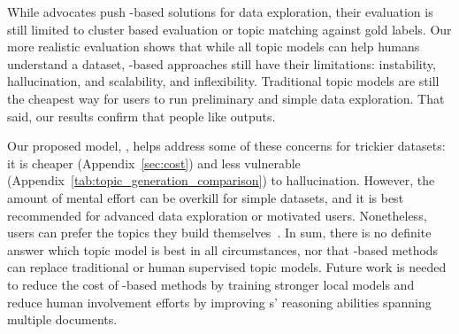 
While advocates push \mm{}-based solutions for data exploration, their
evaluation is still limited to cluster based evaluation or topic
matching against gold labels.
%
Our more realistic evaluation shows that while all topic models can help humans understand a dataset, \mm{}-based approaches still have their limitations: 
instability, hallucination, and scalability, and inflexibility.
%
Traditional topic models are still the cheapest way for users to run
preliminary and simple data exploration.
%
That said, our results confirm that people like \mm{} outputs.

Our proposed model, \bass{}, helps address some of these concerns
for trickier datasets: it is cheaper (Appendix~\ref{sec:cost}) and less vulnerable (Appendix~\ref{tab:topic_generation_comparison}) to
hallucination.
%
However, the amount of mental effort can be overkill for simple
datasets, and it is best recommended for advanced data exploration or
motivated users.
%
Nonetheless, users can prefer the topics they build
themselves~\cite{NORTON2012453}.
% 
In sum, there is no definite answer which topic model is best in all
circumstances, nor that \mm{}-based methods can replace
traditional or human supervised topic models.
% 
Future work is needed to reduce the cost of \mm{}-based methods by training stronger local models and reduce human involvement efforts by improving \mm{}s' reasoning abilities spanning multiple documents.








